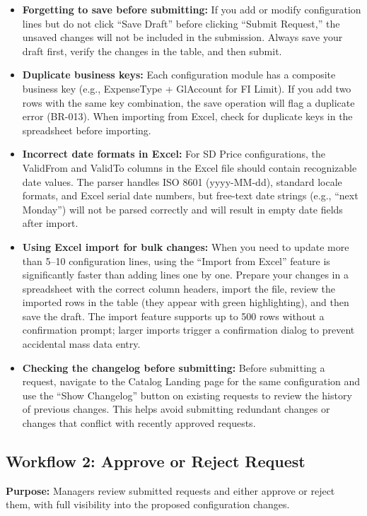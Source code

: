 \documentclass[12pt,a4paper]{report}
\begin{document}
\begin{itemize}[leftmargin=2em]
  \item \textbf{Forgetting to save before submitting:} If you add or modify configuration lines but do not click ``Save Draft'' before clicking ``Submit Request,'' the unsaved changes will not be included in the submission. Always save your draft first, verify the changes in the table, and then submit.
  \item \textbf{Duplicate business keys:} Each configuration module has a composite business key (e.g., ExpenseType + GlAccount for FI Limit). If you add two rows with the same key combination, the save operation will flag a duplicate error (BR-013). When importing from Excel, check for duplicate keys in the spreadsheet before importing.
  \item \textbf{Incorrect date formats in Excel:} For SD Price configurations, the ValidFrom and ValidTo columns in the Excel file should contain recognizable date values. The parser handles ISO 8601 (yyyy-MM-dd), standard locale formats, and Excel serial date numbers, but free-text date strings (e.g., ``next Monday'') will not be parsed correctly and will result in empty date fields after import.
  \item \textbf{Using Excel import for bulk changes:} When you need to update more than 5--10 configuration lines, using the ``Import from Excel'' feature is significantly faster than adding lines one by one. Prepare your changes in a spreadsheet with the correct column headers, import the file, review the imported rows in the table (they appear with green highlighting), and then save the draft. The import feature supports up to 500 rows without a confirmation prompt; larger imports trigger a confirmation dialog to prevent accidental mass data entry.
  \item \textbf{Checking the changelog before submitting:} Before submitting a request, navigate to the Catalog Landing page for the same configuration and use the ``Show Changelog'' button on existing requests to review the history of previous changes. This helps avoid submitting redundant changes or changes that conflict with recently approved requests.
\end{itemize}


\subsection{Workflow 2: Approve or Reject Request}

\textbf{Purpose:} Managers review submitted requests and either approve or reject them, with full visibility into the proposed configuration changes.
\end{document}
